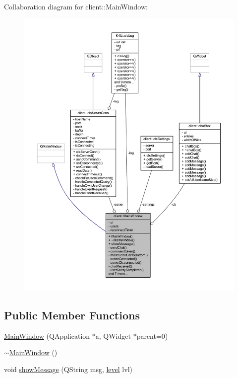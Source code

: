 Collaboration diagram for client\-:\-:Main\-Window\-:\nopagebreak
\begin{figure}[H]
\begin{center}
\leavevmode
\includegraphics[width=350pt]{d4/de6/classclient_1_1_main_window__coll__graph}
\end{center}
\end{figure}
\subsection*{Public Member Functions}
\begin{DoxyCompactItemize}
\item 
\hyperlink{classclient_1_1_main_window_ab4aedce719340218169c114b31b54f70}{Main\-Window} (Q\-Application $\ast$a, Q\-Widget $\ast$parent=0)
\item 
\hyperlink{classclient_1_1_main_window_ae98d00a93bc118200eeef9f9bba1dba7}{$\sim$\-Main\-Window} ()
\item 
void \hyperlink{classclient_1_1_main_window_a39679af3cff16dcf78ae97733c3c1781}{show\-Message} (Q\-String msg, \hyperlink{namespaceshared_ac45ebac56812e48d57e16c9cf057a1db}{level} lvl)
\end{DoxyCompactItemize}
